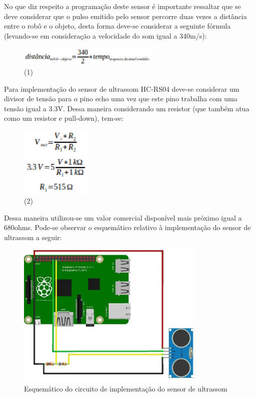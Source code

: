 No que diz respeito a programação deste sensor é importante ressaltar que se deve considerar que o pulso emitido pelo sensor percorre
duas vezes a distância entre o robô e o objeto, desta forma deve-se considerar a seguinte fórmula (levando-se em consideração a velocidade
do som igual a 340m/s):

\begin{figure}[H]
    \centering
    \includegraphics[width=0.6\textwidth]{figuras/distancia.eps}
    \caption{(1)}
    \label{fig:distancia_sensor}
\end{figure}

Para implementação do sensor de ultrassom HC-RS04 deve-se considerar um divisor de tensão para o pino echo uma vez que este pino
trabalha com uma tensão igual a 3.3V. Dessa maneira considerando um resistor (que também atua como um resistor e pull-down), tem-se:

\begin{figure}[H]
    \centering
    \includegraphics[width=0.3\textwidth]{figuras/vout.eps}
    \caption{(2)}
    \label{fig:vout}
\end{figure}

Dessa maneira utilizou-se um valor comercial disponível mais próximo igual a 680ohms. Pode-se observar o esquemático relativo à
implementação do sensor de ultrassom a seguir:

\begin{figure}[H]
    \centering
    \includegraphics[width=0.8\textwidth]{figuras/esquematico_ultrassom.eps}
    \caption{Esquemático do circuito de implementação do sensor de ultrassom}
    \label{fig:esquematico_ultrassom}
\end{figure}

